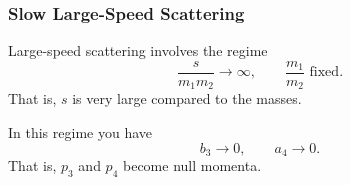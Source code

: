 \subsubsection{Slow Large-Speed Scattering}
Large-speed scattering involves the regime
\begin{equation}
	\frac{s}{m_{1} m_{2}} \rightarrow \infty, \qquad \frac{m_{1}}{m_{2}} \text{ fixed}.
\end{equation}
That is, $s$ is very large compared to the masses.

In this regime you have
\begin{equation}
	b_{3} \rightarrow 0, \qquad a_{4} \rightarrow 0.
\end{equation}
That is, $p_{3}$ and $p_{4}$ become null momenta.
